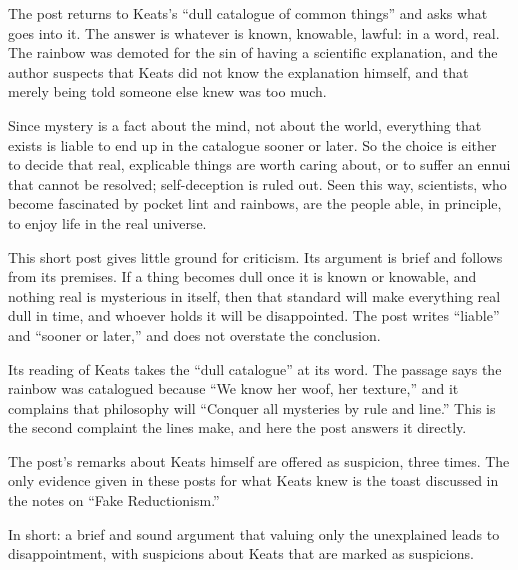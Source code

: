 \begin{afterword}
\summaryhead

The post returns to Keats's ``dull catalogue of common things'' and asks what goes into it. The answer is whatever is known, knowable, lawful: in a word, real. The rainbow was demoted for the sin of having a scientific explanation, and the author suspects that Keats did not know the explanation himself, and that merely being told someone else knew was too much.

Since mystery is a fact about the mind, not about the world, everything that exists is liable to end up in the catalogue sooner or later. So the choice is either to decide that real, explicable things are worth caring about, or to suffer an ennui that cannot be resolved; self-deception is ruled out. Seen this way, scientists, who become fascinated by pocket lint and rainbows, are the people able, in principle, to enjoy life in the real universe.

\responsehead

This short post gives little ground for criticism. Its argument is brief and follows from its premises. If a thing becomes dull once it is known or knowable, and nothing real is mysterious in itself, then that standard will make everything real dull in time, and whoever holds it will be disappointed. The post writes ``liable'' and ``sooner or later,'' and does not overstate the conclusion.

Its reading of Keats takes the ``dull catalogue'' at its word. The passage says the rainbow was catalogued because ``We know her woof, her texture,'' and it complains that philosophy will ``Conquer all mysteries by rule and line.'' This is the second complaint the lines make, and here the post answers it directly.

The post's remarks about Keats himself are offered as suspicion, three times. The only evidence given in these posts for what Keats knew is the toast discussed in the notes on ``Fake Reductionism.''

In short: a brief and sound argument that valuing only the unexplained leads to disappointment, with suspicions about Keats that are marked as suspicions.
\end{afterword}
